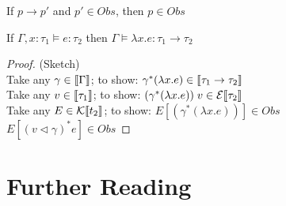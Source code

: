 \begin{lemma}
  If $p \longrightarrow p'$ and $p' \in Obs$, then $p \in Obs$
\end{lemma}

\begin{lemma}
  If $\Gamma,x : \tau_1 \models e : \tau_2$ then $\Gamma\models \lambda x.e : \tau_1 \to \tau_2$
\end{lemma}
\begin{proof}(Sketch)\\
  Take any $\gamma \in \llbracket\Gamma\rrbracket$;
    to show: $\gamma^*(\lambda x.e) \in \llbracket\tau_1 \to \tau_2\rrbracket$\\
  Take any $v \in \llbracket\tau_1\rrbracket$;
    to show: $(\gamma^* (\lambda x.e))\;v \in \mathcal{E}\llbracket\tau_2\rrbracket$\\
  Take any $E \in \mathcal{K}\llbracket t_2\rrbracket$;
    to show: $E[(\gamma^* (\lambda x.e))] \in Obs$\\
  $E[(v \triangleleft \gamma)^* e] \in Obs$
\end{proof}

\section{Further Reading}
